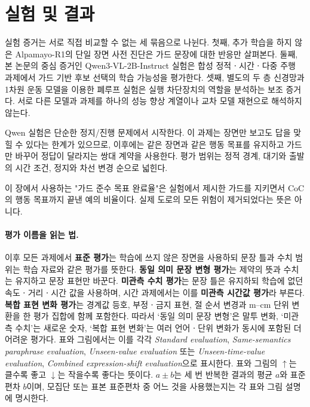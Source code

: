 \section{실험 및 결과}
\label{sec:experiments}


실험 증거는 서로 직접 비교할 수 없는 세 묶음으로 나뉜다. 첫째, 추가 학습을 하지 않은 Alpamayo-R1의 단일 장면 사전 진단은 가드 문장에 대한 반응만 살펴본다. 둘째, 본 논문의 중심 증거인 Qwen3-VL-2B-Instruct 실험은 합성 정적ㆍ시간ㆍ다중 주행 과제에서 가드 기반 후보 선택의 학습 가능성을 평가한다. 셋째, 별도의 두 층 신경망과 1차원 운동 모델을 이용한 폐루프 실험은 실행 차단장치의 역할을 분석하는 보조 증거다. 서로 다른 모델과 과제를 하나의 성능 향상 계열이나 교차 모델 재현으로 해석하지 않는다.

Qwen 실험은 단순한 정지/진행 문제에서 시작한다. 이 과제는 장면만 보고도 답을 맞힐 수 있다는 한계가 있으므로, 이후에는 같은 장면과 같은 행동 목표를 유지하고 가드만 바꾸어 정답이 달라지는 쌍대 계약을 사용한다. 평가 범위는 정적 경계, 대기와 출발의 시간 조건, 정지와 차선 변경 순으로 넓힌다.

이 장에서 사용하는 "가드 준수 목표 완료율"은 실험에서 제시한 가드를 지키면서 CoC의 행동 목표까지 끝낸 예의 비율이다. 실제 도로의 모든 위험이 제거되었다는 뜻은 아니다. 

\paragraph{평가 이름을 읽는 법.}
이후 모든 과제에서 \textbf{표준 평가}는 학습에 쓰지 않은 장면을 사용하되 문장 틀과 수치 범위는 학습 자료와 같은 평가를 뜻한다. \textbf{동일 의미 문장 변형 평가}는 제약의 뜻과 수치는 유지하고 문장 표현만 바꾼다. \textbf{미관측 수치 평가}는 문장 틀은 유지하되 학습에 없던 속도ㆍ거리ㆍ시간 값을 사용하며, 시간 과제에서는 이를 \textbf{미관측 시간값 평가}라 부른다. \textbf{복합 표현 변화 평가}는 경계값 등호, 부정ㆍ금지 표현, 절 순서 변경과 m--cm 단위 변환을 한 평가 집합에 함께 포함한다. 따라서 `동일 의미 문장 변형'은 말투 변화, `미관측 수치'는 새로운 숫자, `복합 표현 변화'는 여러 언어ㆍ단위 변화가 동시에 포함된 더 어려운 평가다. 표와 그림에서는 이를 각각 \textit{Standard evaluation}, \textit{Same-semantics paraphrase evaluation}, \textit{Unseen-value evaluation} 또는 \textit{Unseen-time-value evaluation}, \textit{Combined expression-shift evaluation}으로 표시한다. 표와 그림의 $\uparrow$는 클수록 좋고 $\downarrow$는 작을수록 좋다는 뜻이다. $a\pm b$는 세 번 반복한 결과의 평균 $a$와 표준편차 $b$이며, 모집단 또는 표본 표준편차 중 어느 것을 사용했는지는 각 표와 그림 설명에 명시한다.

